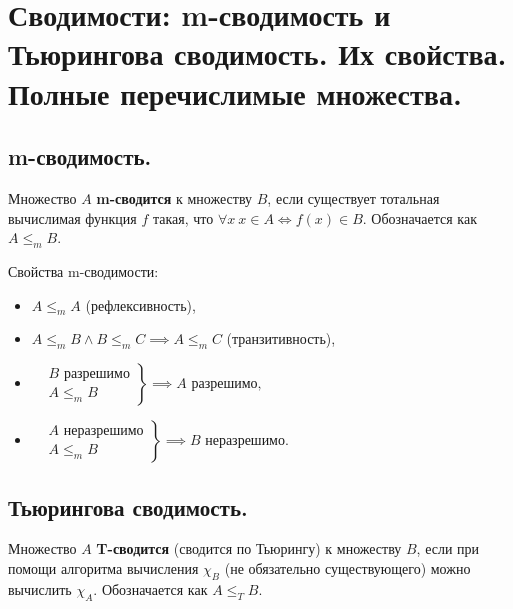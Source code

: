 \section{Сводимости: m-сводимость и Тьюрингова сводимость. Их свойства. Полные перечислимые множества.}

\subsection{m-сводимость.}

\begin{definition}
    Множество $A$ \textbf{m-сводится} к множеству $B$, если существует тотальная вычислимая
    функция $f$ такая, что $\forall x \ x \in A \iff f(x) \in B$. Обозначается как $A
    \leqslant_m B$.
\end{definition}

Свойства m-сводимости:
\begin{itemize}
    \item $A \leqslant_m A$ (рефлексивность),
    \item $A \leqslant_m B \wedge B \leqslant_m C \implies A \leqslant_m C$ (транзитивность),
    \item
    $
    \left.\begin{aligned}
            &B \text{ разрешимо}\\
            &A \leqslant_m B
    \end{aligned}\right\}
    \implies A \text{ разрешимо},
    $
    \item
    $
    \left.\begin{aligned}
            &A \text{ неразрешимо}\\
            &A \leqslant_m B
    \end{aligned}\right\}
    \implies B \text{ неразрешимо}.
    $
\end{itemize}

\subsection{Тьюрингова сводимость.}

\begin{definition}
    Множество $A$ \textbf{T-сводится} (сводится по Тьюрингу) к множеству $B$, если при помощи
    алгоритма вычисления $\chi_B$ (не обязательно существующего) можно вычислить $\chi_A$.
    Обозначается как $A \leqslant_T B$.
\end{definition}

